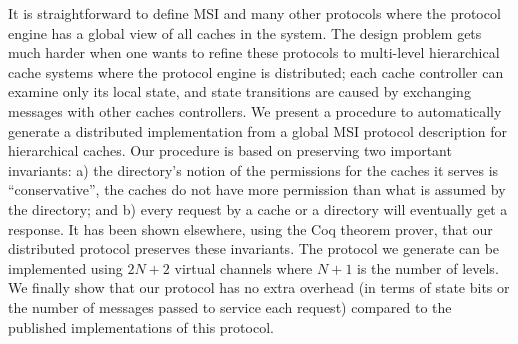 
It is straightforward to define MSI and many other protocols where the protocol
engine has a global view of all caches in the system.  The design problem gets
much harder when one wants to refine these protocols to multi-level hierarchical
cache systems where the protocol engine is distributed; each cache controller
can examine only its local state, and state transitions are caused by
exchanging messages with other caches controllers. We present a procedure to
automatically generate a distributed implementation from a global MSI protocol
description for hierarchical caches. Our procedure is based on preserving two
important invariants: a) the directory's notion of the permissions for the
caches it serves is ``conservative'', \ie the caches do not have more
permission than what is assumed by the directory; and b) every request by a
cache or a directory will eventually get a response. It has been shown
elsewhere, using the Coq theorem prover, that our distributed protocol
preserves these invariants.  The protocol we generate can be implemented using
$2N + 2$ virtual channels where $N + 1$ is the number of levels. We finally show
that our protocol has no extra overhead (in terms of state bits or the number
of messages passed to service each request) compared to the published
implementations of this protocol. 
